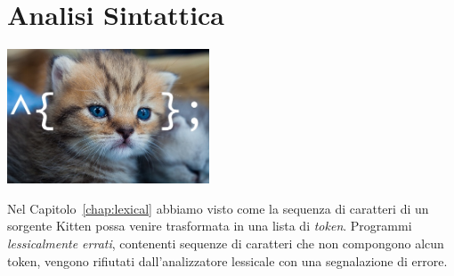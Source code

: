\chapter{Analisi Sintattica}\label{chap:syntactical}
%
\vspace*{-2ex}
\begin{center}
\includegraphics[width=6cm]{cat2.jpeg}
\end{center}
\vspace*{-2ex}
%
Nel Capitolo~\ref{chap:lexical} abbiamo visto come la sequenza di
caratteri di un sorgente Kitten possa venire trasformata in una lista
di \emph{token}. Programmi \emph{lessicalmente errati}, \cioe
contenenti sequenze di caratteri che non compongono alcun
token, vengono rifiutati dall'analizzatore lessicale con una segnalazione
di errore.

